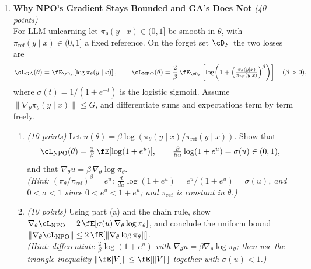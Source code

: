 \documentclass[12pt]{article}
\begin{document}
\begin{enumerate}
\begin{problem}
    \newpage~\newpage
\end{problem}

\item {\bf Why NPO's Gradient Stays Bounded and GA's Does Not} {\it (40 points)}\\
For LLM unlearning let $\pi_\theta(y\mid x) \in (0,1]$ be smooth in $\theta$, with $\pi_{\mathrm{ref}}(y\mid x) \in (0,1]$ a fixed reference. On the forget set $\cD_F$ the two losses are
\begin{align*}
    \cL_{\mathrm{GA}}(\theta) = \fE_{\cD_F}\!\left[\log\pi_\theta(y\mid x)\right], \qquad
    \cL_{\mathrm{NPO}}(\theta) = \frac{2}{\beta}\,\fE_{\cD_F}\!\left[\log\!\left(1 + \left(\tfrac{\pi_\theta(y\mid x)}{\pi_{\mathrm{ref}}(y\mid x)}\right)^{\beta}\right)\right] \quad (\beta>0),
\end{align*}
where $\sigma(t) = 1/(1+e^{-t})$ is the logistic sigmoid. Assume $\|\nabla_\theta\pi_\theta(y\mid x)\| \le G$, and differentiate sums and expectations term by term freely.
\begin{enumerate}
    \item {\it (10 points)} Let $u(\theta) = \beta\log\!\left(\pi_\theta(y\mid x)/\pi_{\mathrm{ref}}(y\mid x)\right)$. Show that
    \begin{align*}
        \cL_{\mathrm{NPO}}(\theta) = \tfrac{2}{\beta}\,\fE[\log(1+e^{u})], \qquad \tfrac{\partial}{\partial u}\log(1+e^u) = \sigma(u) \in (0,1),
    \end{align*}
    and that $\nabla_\theta u = \beta\,\nabla_\theta\log\pi_\theta$.\\
    \emph{(Hint: $(\pi_\theta/\pi_{\mathrm{ref}})^\beta = e^u$; $\frac{d}{du}\log(1+e^u) = e^u/(1+e^u) = \sigma(u)$, and $0<\sigma<1$ since $0<e^u<1+e^u$; and $\pi_{\mathrm{ref}}$ is constant in $\theta$.)}

    \item {\it (10 points)} Using part (a) and the chain rule, show $\nabla_\theta\cL_{\mathrm{NPO}} = 2\,\fE[\sigma(u)\,\nabla_\theta\log\pi_\theta]$, and conclude the uniform bound $\|\nabla_\theta\cL_{\mathrm{NPO}}\| \le 2\,\fE[\|\nabla_\theta\log\pi_\theta\|]$.\\
    \emph{(Hint: differentiate $\frac{2}{\beta}\log(1+e^u)$ with $\nabla_\theta u = \beta\nabla_\theta\log\pi_\theta$; then use the triangle inequality $\|\fE[V]\| \le \fE[\|V\|]$ together with $\sigma(u)<1$.)}


\end{enumerate}
\end{enumerate}
\end{document}
